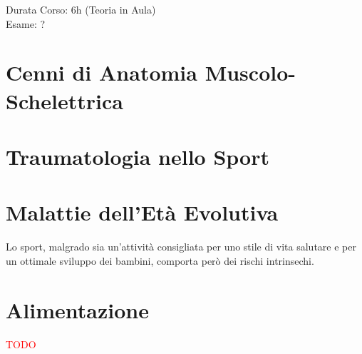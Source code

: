 \documentclass[../uefaC.tex]{subfiles}
\begin{document}

Durata Corso: 6h (Teoria in Aula) \hfill \\
Esame: ?

\section{Cenni di Anatomia Muscolo-Schelettrica}

\section{Traumatologia nello Sport}

\section{Malattie dell'Età Evolutiva}

Lo sport, malgrado sia un'attività consigliata per uno stile di vita salutare e per un ottimale sviluppo dei bambini, comporta però dei rischi intrinsechi.

\section{Alimentazione}

\textcolor{red}{TODO}
\end{document}
